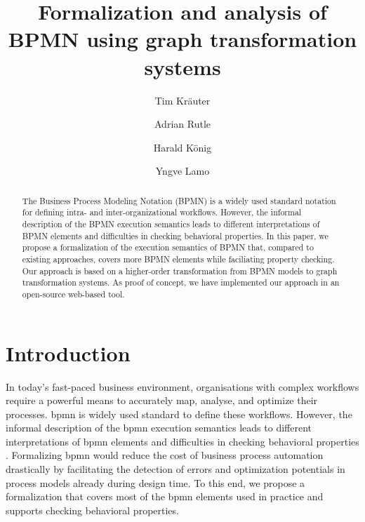 \documentclass[runningheads]{llncs}
\begin{document}
%
\title{Formalization and analysis of BPMN using graph transformation systems}
%
%
\author{Tim Kr\"{a}uter \and
Adrian Rutle \and
Harald K\"{o}nig \and
Yngve Lamo}
%
%
%
\maketitle              %
%
\begin{abstract}
The Business Process Modeling Notation (BPMN) is a widely used standard notation for defining intra- and inter-organizational workflows.
However, the informal description of the BPMN execution semantics leads to different interpretations of BPMN elements and difficulties in checking behavioral properties.
In this paper, we propose a formalization of the execution semantics of BPMN that, compared to existing approaches, covers more BPMN elements while faciliating property checking.
Our approach is based on a higher-order transformation from BPMN models to graph transformation systems.
As proof of concept, we have implemented our approach in an open-source web-based tool.

\end{abstract}

\section{Introduction}
In today's fast-paced business environment, organisations with complex workflows require a powerful means to accurately map, analyse, and optimize their processes. 
\gls*{bpmn} \cite{objectmanagementgroupBusinessProcessModel2013} is widely used standard to define these workflows.
However, the informal description of the \gls*{bpmn} execution semantics leads to different interpretations of \gls*{bpmn} elements and difficulties in checking behavioral properties \cite{corradiniFormalApproachAnalysis2021}.
Formalizing \gls*{bpmn} would reduce the cost of business process automation drastically by facilitating the detection of errors and optimization potentials in process models already during design time. 
To this end, we propose a formalization that covers most of the \gls*{bpmn} elements used in practice and supports checking behavioral properties.
\end{document}
